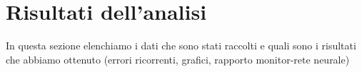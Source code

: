 \chapter{Risultati dell'analisi}

In questa sezione elenchiamo i dati che sono stati raccolti e quali sono i risultati che abbiamo ottenuto (errori ricorrenti, grafici, rapporto monitor-rete neurale)
